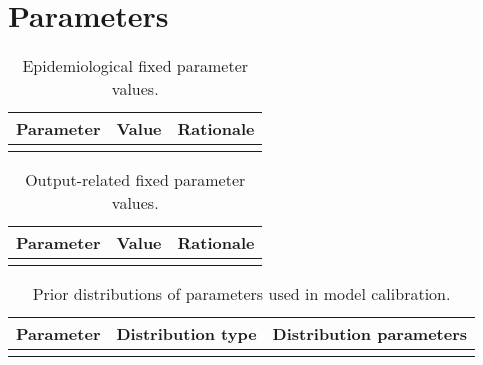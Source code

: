\documentclass{article}
\begin{document}

\section{Parameters}


\begin{table}[h]
    \begin{tabularx}{\textwidth}{| X | p{2.5cm} | X |}
    \hline
    \textbf{Parameter} & \textbf{Value} & \textbf{Rationale} \\
    \hline
     \\
    \hline
    \end{tabularx}
	\caption{Epidemiological fixed parameter values.}
    \label{tab:fixed_params}
\end{table}

\begin{table}[h]
    \begin{tabularx}{\textwidth}{| X | p{2.5cm} | X |}
    \hline
    \textbf{Parameter} & \textbf{Value} & \textbf{Rationale} \\
    \hline
     \\
    \hline
    \end{tabularx}
	\caption{Output-related fixed parameter values.}
    \label{tab:output_params}
\end{table}

\begin{table}[h]
    \begin{tabularx}{\textwidth}{| X | p{2.5cm} | X |}
    \hline
    \textbf{Parameter} & \textbf{Distribution type} & \textbf{Distribution parameters} \\
    \hline
     \\
    \hline
    \end{tabularx}
	\caption{Prior distributions of parameters used in model calibration.}
    \label{tab:priors}
\end{table}

\newpage
\printbibliography
\end{document}
